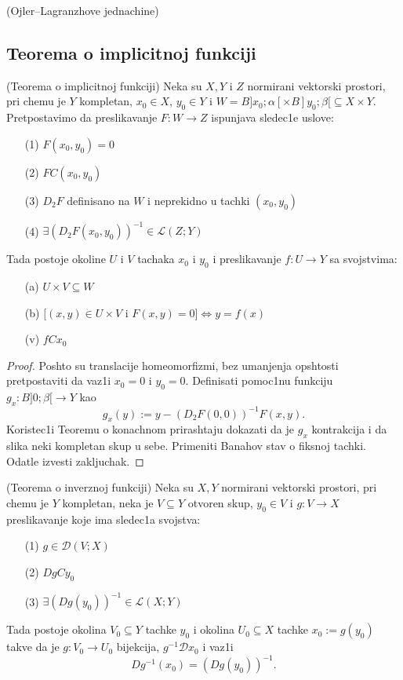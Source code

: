 \documentclass[a4paper,12pt]{article}
\begin{document}
\begin{pr}(Ojler--Lagranzhove jednachine)
\end{pr}

\newpage

\subsection{Teorema o implicitnoj funkciji}

\begin{tma}
(Teorema o implicitnoj funkciji) Neka su $X, Y$ i $Z$ normirani vektorski prostori, pri chemu je $Y$ kompletan, $x_0 \in X$, $y_0 \in Y$ i $W = B]x_0; \alpha[ \times B]y_0; \beta[ \subseteq X \times Y$. Pretpostavimo da preslikavanje $F:W \to Z$ ispunjava sledec1e uslove:
\begin{enumerate}
\item[(1)] $F(x_0, y_0) = 0$
\item[(2)] $FC(x_0, y_0)$
\item[(3)] $D_2F$ definisano na $W$ i neprekidno u tachki $(x_0, y_0)$
\item[(4)] $\exists {(D_2F(x_0, y_0))}^{-1} \in \mathcal{L} (Z; Y)$
\end{enumerate}
Tada postoje okoline $U$ i $ V$ tachaka $x_0$ i $y_0$ i preslikavanje $f: U \to Y$ sa svojstvima:
\begin{enumerate}
\item[(a)] $U \times V \subseteq W$
\item[(b)] $[(x,y)\in U \times V$ i $F(x,y) = 0] \iff y = f(x)$
\item[(v)] $fCx_0$

\end{enumerate}
\end{tma}
\begin{proof}
Poshto su translacije homeomorfizmi, bez umanjenja opshtosti pretpostaviti da vaz1i $x_0 = 0 $ i $y_0 = 0$. Definisati pomoc1nu funkciju $g_x: B]0; \beta[ \to Y$ kao \[g_x(y) := y - {(D_2F(0, 0))}^{-1} F(x,y).\] Koristec1i Teoremu o konachnom prirashtaju dokazati da je $g_x$ kontrakcija i da slika neki kompletan skup u sebe. Primeniti Banahov stav o fiksnoj tachki. Odatle izvesti zakljuchak. 
\end{proof}
\begin{tma}
(Teorema o inverznoj funkciji) Neka su $X, Y$ normirani vektorski prostori, pri chemu je $Y$ kompletan, neka je $V \subseteq Y$ otvoren skup, $y_0 \in V$ i $g: V \to X$ preslikavanje koje ima sledec1a svojstva:
\begin{enumerate}
\item[(1)] $g \in \mathcal{D}(V;X)$
\item[(2)] $DgCy_0$
\item[(3)] $\exists {(Dg(y_0))}^{-1} \in \mathcal{L} (X; Y)$
\end{enumerate}
Tada postoje okolina $V_0 \subseteq Y$ tachke $y_0$ i okolina $U_0 \subseteq X$ tachke $x_0 := g(y_0)$ takve da je $g: V_0 \to U_0$ bijekcija, $g^{-1} \mathcal{D} x_0$ i vaz1i \[ Dg^{-1}(x_0) = {(Dg(y_0))}^{-1}.\]
\end{tma}
\end{document}
